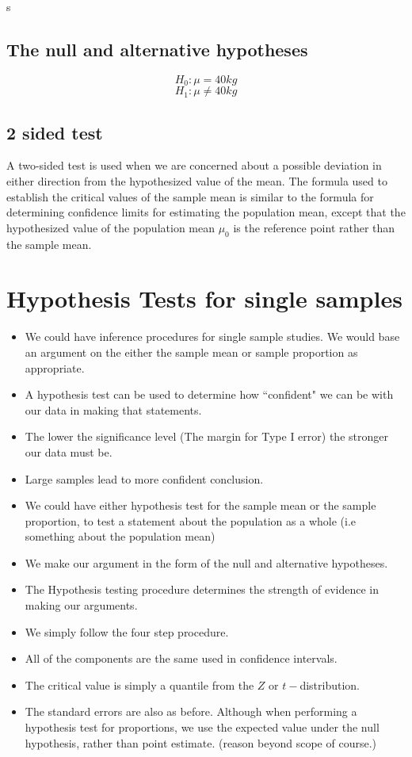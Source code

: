s\documentclass[]{report}
\begin{document}
\subsection*{The null and alternative hypotheses}
\[ H_0: \mu = 40 kg\]
\[ H_1: \mu \neq 40 kg\]




\subsection{2 sided test}
A two-sided test is used when we are concerned about a possible
deviation in either direction from the hypothesized value of the
mean. The formula used to establish the critical values of the
sample mean is similar to the formula for determining confidence
limits for estimating the population mean, except that the
hypothesized value of the population mean $\mu_0$ is the reference
point rather than the sample mean.







\section{Hypothesis Tests for single samples}

\begin{itemize}
\item We could have inference procedures for single sample studies. We would base an argument on the either the sample mean or sample proportion as appropriate.
\item A hypothesis test can be used to determine how ``confident" we can be with our data in making that statements.
\item The lower the significance level (The margin for Type I error) the stronger our data must be.
\item Large samples lead to more confident conclusion.

\medskip

\item We could have either hypothesis test for the sample mean or the sample proportion, to test a statement about the population as a whole (i.e something about the population mean)
\item We make our argument in the form of the null and alternative hypotheses. 
\item The Hypothesis testing procedure determines the strength of evidence in making our arguments. 

\medskip

\item We simply follow the four step procedure. 
\item All of the components are the same used in confidence intervals.
\item The critical value is simply a quantile from the $Z$ or $t-$distribution.
\item The standard errors are also as before. Although when performing a hypothesis test for proportions, we use the expected value under the null hypothesis, rather than point estimate. (reason beyond scope of course.)
\end{itemize}


\end{document}
